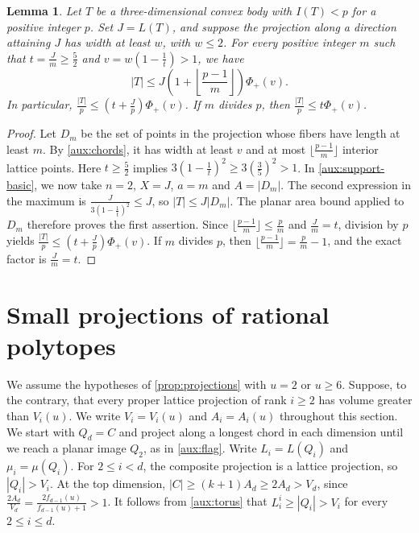 \documentclass[reqno, 11pt]{article}
\numberwithin{equation}{section}
\newtheorem{lemma}[lemma]{Lemma}
\theoremstyle{definition}
\begin{document}
\begin{lemma}\label{lem:three-count}
Let $T$ be a three-dimensional convex body with $I(T)<p$ for a
positive integer $p$. Set $J=L(T)$, and suppose the projection
along a direction attaining $J$ has width at least $w$, with $w\le2$.
For every positive integer $m$ such that $t=\frac{J}{m}\ge\frac{5}{2}$ and
$v=w(1-\frac{1}{t})>1$, we have
\[
 |T|\le J\left(1+\left\lfloor\frac{p-1}{m}\right\rfloor\right)\Phi_+(v).
\]
In particular, $\frac{|T|}{p}\le(t+\frac{J}{p})\Phi_+(v)$. If $m$ divides $p$, then
$\frac{|T|}{p}\le t\Phi_+(v)$.
\end{lemma}

\begin{proof}
Let $D_m$ be the set of points in the projection whose fibers have
length at least $m$. By \cref{aux:chords}, it has width at least $v$
and at most $\lfloor\frac{p-1}{m}\rfloor$ interior lattice points.
Here $t\ge\frac{5}{2}$ implies
$3(1-\frac{1}{t})^2\ge3(\frac{3}{5})^2>1$.
In \eqref{aux:support-basic}, we now take $n=2$, $X=J$, $a=m$ and
$A=|D_m|$. The second expression in the maximum is
$\frac{J}{3(1-\frac{1}{t})^2}\le J$, so $|T|\le J|D_m|$.
The planar area bound applied to $D_m$ therefore proves the first
assertion. Since $\lfloor\frac{p-1}{m}\rfloor\le\frac{p}{m}$
and $\frac{J}{m}=t$, division by $p$ yields
$\frac{|T|}{p}\le(t+\frac{J}{p})\Phi_+(v)$.
If $m$ divides $p$, then $\lfloor\frac{p-1}{m}\rfloor=\frac{p}{m}-1$,
and the exact factor is $\frac{J}{m}=t$.
\end{proof}

\section{Small projections of rational polytopes}\label{sec:rational-volumes}

We assume the hypotheses of \cref{prop:projections} with $u=2$ or $u\ge6$.
Suppose, to the contrary, that every proper lattice projection of rank
$i\ge2$ has volume greater than $V_i(u)$. We write $V_i=V_i(u)$ and
$A_i=A_i(u)$ throughout this section. We start with $Q_d=C$ and project along a longest chord in each
dimension until we reach a planar image
$Q_2$, as in \cref{aux:flag}. Write $L_i=L(Q_i)$ and $\mu_i=\mu(Q_i)$.
For $2\le i<d$, the composite projection is a lattice projection, so
$|Q_i|>V_i$. At the top dimension, $|C|\ge(k+1)A_d\ge2A_d>V_d$,
since $\frac{2A_d}{V_d}=\frac{2f_{d-1}(u)}{f_{d-1}(u)+1}>1$.
It follows from \cref{aux:torus} that $L_i^i\ge|Q_i|>V_i$ for every
$2\le i\le d$.
\end{document}
